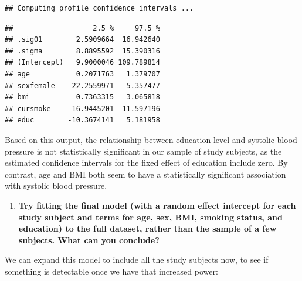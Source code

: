 \documentclass[
]{book}
\newenvironment{Shaded}{\begin{snugshade}}{\end{snugshade}}
\newcommand{\DataTypeTok}[1]{\textcolor[rgb]{0.13,0.29,0.53}{#1}}
\newcommand{\DecValTok}[1]{\textcolor[rgb]{0.00,0.00,0.81}{#1}}
\newcommand{\KeywordTok}[1]{\textcolor[rgb]{0.13,0.29,0.53}{\textbf{#1}}}
\newcommand{\NormalTok}[1]{#1}
\newcommand{\OperatorTok}[1]{\textcolor[rgb]{0.81,0.36,0.00}{\textbf{#1}}}
\newcommand{\StringTok}[1]{\textcolor[rgb]{0.31,0.60,0.02}{#1}}
\providecommand{\tightlist}{%
  \setlength{\itemsep}{0pt}\setlength{\parskip}{0pt}}
\begin{document}
\begin{verbatim}
## Computing profile confidence intervals ...
\end{verbatim}

\begin{verbatim}
##                   2.5 %     97.5 %
## .sig01        2.5909664  16.942640
## .sigma        8.8895592  15.390316
## (Intercept)   9.9000046 109.789814
## age           0.2071763   1.379707
## sexfemale   -22.2559971   5.357477
## bmi           0.7363315   3.065818
## cursmoke    -16.9445201  11.597196
## educ        -10.3674141   5.181958
\end{verbatim}

Based on this output, the relationship between education level and systolic
blood pressure is not statistically significant in our sample of study subjects,
as the estimated confidence intervals for the fixed effect of education include
zero. By contrast, age and BMI both seem to have a statistically significant
association with systolic blood pressure.

\begin{enumerate}
\def\labelenumi{\arabic{enumi}.}
\setcounter{enumi}{3}
\tightlist
\item
  \textbf{Try fitting the final model (with a random effect intercept for each study
  subject and terms for age, sex, BMI, smoking status, and education) to the
  full dataset, rather than the sample of a few subjects. What can you conclude?}
\end{enumerate}

We can expand this model to include all the study subjects now, to see if
something is detectable once we have that increased power:

\begin{Shaded}
\end{Shaded}
\end{document}
